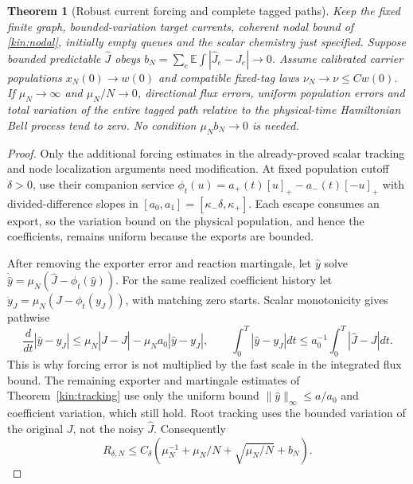 \documentclass[11pt,oneside,openany]{book}
\newtheorem{theorem}{Theorem}[chapter]
\theoremstyle{definition}
\theoremstyle{remark}\newtheorem{remark}[theorem]{Remark}
\begin{document}
\begin{theorem}[Robust current forcing and complete tagged paths]
\label{copy:robust}
Keep the fixed finite graph, bounded-variation target currents,
coherent nodal bound of \eqref{kin:nodal}, initially empty queues and
the scalar chemistry just specified. Suppose bounded predictable
$\widehat J$ obeys $b_N=\sum_e\mathbb E\int|\widehat J_e-J_e|\to0$.
Assume calibrated carrier populations $x_N(0)\to w(0)$ and compatible
fixed-tag laws $\nu_N\to\nu\le Cw(0)$. If
$\mu_N\to\infty$ and $\mu_N/N\to0$, directional flux errors,
uniform population errors and total variation of the entire tagged
path relative to the physical-time Hamiltonian Bell process tend to
zero. No condition $\mu_Nb_N\to0$ is needed.
\end{theorem}
\begin{proof}
Only the additional forcing estimates in the already-proved scalar
tracking and node localization arguments need modification. At fixed
population cutoff $\delta>0$, use their companion service
$\phi_t(u)=a_+(t)[u]_+-a_-(t)[-u]_+$ with divided-difference slopes
in $[a_0,a_1]=[\kappa_-\delta,\kappa_+]$. Each escape consumes an
export, so the variation bound on the physical population, and hence
the coefficients, remains uniform because the exports are bounded.

After removing the exporter error and reaction martingale, let
$\widehat y$ solve
$\dot{\widehat y}=\mu_N(\widehat J-\phi_t(\widehat y))$.
For the same realized coefficient history let
$\dot y_J=\mu_N(J-\phi_t(y_J))$, with matching zero starts.
Scalar monotonicity gives pathwise
\[
 \frac d{dt}|\widehat y-y_J|
 \le\mu_N|\widehat J-J|-\mu_Na_0|\widehat y-y_J|,
 \qquad
 \int_0^T|\widehat y-y_J|dt
                   \le a_0^{-1}\int_0^T|\widehat J-J|dt.
\]
This is why forcing error is not multiplied by the fast scale in the
integrated flux bound. The remaining exporter and martingale estimates
of Theorem~\ref{kin:tracking} use only the uniform bound
$\|\widehat y\|_\infty\le a/a_0$ and coefficient variation, which
still hold. Root tracking uses the bounded variation of the original
$J$, not the noisy $\widehat J$. Consequently
\begin{equation}
 R_{\delta,N}\le C_\delta\left(
     \mu_N^{-1}+\mu_N/N+\sqrt{\mu_N/N}+b_N\right).           \label{copy:robust-R}
\end{equation}


\end{proof}
\end{document}
